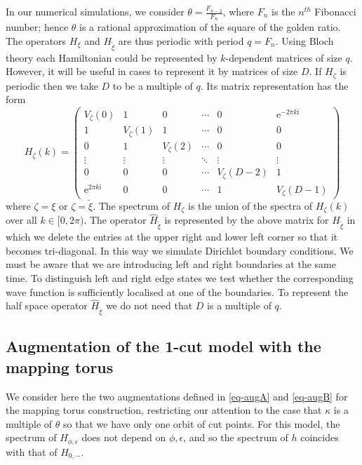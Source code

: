 \documentclass[11pt]{amsart}
\newcommand{\cut}{\kappa}
\newcommand{\q}{q}
\begin{document}
In our numerical simulations, we consider $\theta=\frac{F_{n-2}}{F_n}$, where $F_n$ is the $n^{th}$ Fibonacci number; hence $\theta$ is a rational approximation of the square of the golden ratio. The operators $H_{\xi}$ and $H_{\tilde \xi}$ are thus periodic with period $\q=F_n$.
Using Bloch theory each Hamiltonian could be represented by $k$-dependent matrices of size $\q$. However, it will be useful in cases to represent it by matrices of size $D$. If $H_\zeta$ is periodic then we take $D$ to be a multiple of $\q$. Its matrix representation has the form  
\[
H_\zeta(k) = \begin{pmatrix}
	V_\zeta(0) & 1 & 0 & \cdots & 0 & \mathrm{e}^{-2\pi k\mathrm{i}} \\
	1 & V_\zeta(1) & 1 & \cdots & 0 & 0 \\
	0 & 1 & V_\zeta(2) & \cdots & 0 & 0 \\
	\vdots & \vdots & \vdots & \ddots & \vdots & \vdots \\
	0 & 0 & 0 & \cdots & V_\zeta(D-2) & 1 \\
	\mathrm{e}^{2\pi k\mathrm{i}} & 0 & 0 & \cdots & 1 & V_\zeta(D-1)
\end{pmatrix}
\]
where $\zeta = \xi$ or $\zeta=\tilde\xi$. The spectrum of $H_\zeta$ is the union of the spectra of $H_\zeta(k)$ over all $k\in
[0, 2\pi)$.
The operator $\hat H_{\tilde\xi}$ is represented by the above matrix for $H_{\tilde\xi}$ in which we delete the entries at the upper right and lower left corner so that it becomes tri-diagonal. In this way we simulate Dirichlet boundary conditions. We must be aware that we are introducing left and right boundaries at the same time. To distinguish left and right edge states we test whether the corresponding wave function is sufficiently localised at one of the boundaries. To represent the half space operator $\hat H_{\tilde\xi}$ we do not need that $D$ is a multiple of $\q$. 


\subsection{Augmentation of the 1-cut model with the mapping torus}
We consider here the two augmentations defined in \eqref{eq-augA} and \eqref{eq-augB} for the mapping torus construction, restricting our attention to the case that $\cut$ is a multiple of $\theta$ so that we have only one orbit of cut points.
For this model, the spectrum of $H_{\phi,\epsilon}$ does not depend on 
${\phi,\epsilon}$, and so the spectrum of $h$ coincides with that of $H_{0,-}$. 
\end{document}
